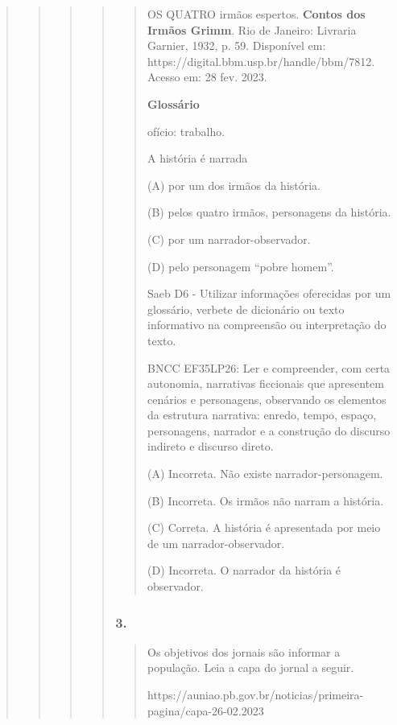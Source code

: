 \begin{quote}
\begin{quote}
\begin{quote}
\begin{quote}
\begin{quote}
OS QUATRO irmãos espertos. \textbf{Contos dos Irmãos Grimm}. Rio de
Janeiro: Livraria Garnier, 1932, p. 59. Disponível em:
https://digital.bbm.usp.br/handle/bbm/7812. Acesso em: 28 fev. 2023.

\textbf{Glossário}

ofício: trabalho.

A história é narrada

(A) por um dos irmãos da história.

(B) pelos quatro irmãos, personagens da história.

(C) por um narrador-observador.

(D) pelo personagem ``pobre homem''.

Saeb D6 - Utilizar informações oferecidas por um glossário, verbete de
dicionário ou texto informativo na compreensão ou interpretação do
texto.

BNCC EF35LP26: Ler e compreender, com certa autonomia, narrativas
ficcionais que apresentem cenários e personagens, observando os
elementos da estrutura narrativa: enredo, tempo, espaço, personagens,
narrador e a construção do discurso indireto e discurso direto.

(A) Incorreta. Não existe narrador-personagem.

(B) Incorreta. Os irmãos não narram a história.

(C) Correta. A história é apresentada por meio de um
narrador-observador.

(D) Incorreta. O narrador da história é observador.
\end{quote}

\subsubsection{3. }\label{section-92}

\begin{quote}
Os objetivos dos jornais são informar a população. Leia a capa do jornal
a seguir.

https://auniao.pb.gov.br/noticias/primeira-pagina/capa-26-02.2023


\end{quote}
\end{quote}
\end{quote}
\end{quote}
\end{quote}
